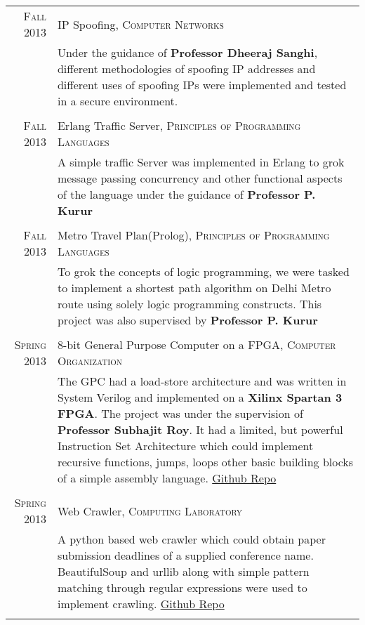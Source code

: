 \documentclass[a4paper,10pt]{article} %
\begin{document}
\begin{tabular}{r|p{11cm}}
    \textsc{Fall 2013} & IP Spoofing, \textsc{Computer Networks} \\
       & \footnotesize{Under the guidance of \textbf{Professor Dheeraj Sanghi}, different methodologies of spoofing
            IP addresses and different uses of spoofing IPs were implemented and tested in a secure environment.}\\
            \\

    \textsc{Fall 2013} & Erlang Traffic Server, \textsc{Principles of Programming Languages} \\
       & \footnotesize{A simple traffic Server was implemented in Erlang to grok message passing concurrency and other
        functional aspects of the language under the guidance of \textbf{Professor P. Kurur}}\\
            \\

    \textsc{Fall 2013} & Metro Travel Plan(Prolog), \textsc{Principles of Programming Languages} \\
       & \footnotesize{To grok the concepts of logic programming, we were tasked to implement a shortest path
        algorithm on Delhi Metro route using solely logic programming constructs. This project was also supervised by
        \textbf{Professor P. Kurur}}\\
            \\

    \textsc{Spring 2013} & 8-bit General Purpose Computer on a FPGA, \textsc{Computer Organization} \\
        & \footnotesize{The GPC had a load-store architecture and was written in System Verilog and implemented on a \textbf{Xilinx Spartan 3 FPGA}.
            The project was under the supervision of \textbf{Professor Subhajit Roy}.
            It had a limited, but powerful Instruction Set Architecture which could implement recursive functions, jumps,
            loops  other basic building blocks of a simple assembly language.
            \href{https://github.com/srijanshetty/220_y11} {Github Repo}} \\
            \\

    \textsc{Spring 2013} & Web Crawler, \textsc{Computing Laboratory} \\
        & \footnotesize{A python based web crawler which could obtain paper submission deadlines of a supplied conference name.
            BeautifulSoup and urllib along with simple pattern matching through regular expressions were used to implement crawling.
            \href{https://github.com/srijanshetty/crawler} {Github Repo} } \\
            \\


\end{tabular}
\end{document}
